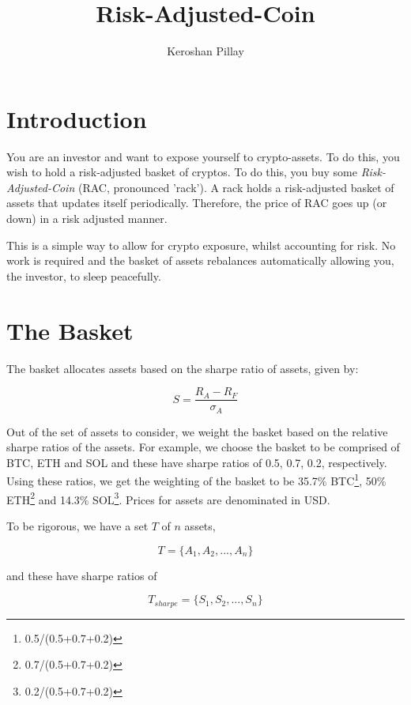 \documentclass[11pt]{article}
\title{Risk-Adjusted-Coin}
\author{Keroshan Pillay}
\begin{document}
\maketitle

\section{Introduction}

You are an investor and want to expose yourself to crypto-assets. To do this, you wish to hold a risk-adjusted basket of cryptos. To do this, you buy some \emph{Risk-Adjusted-Coin} (RAC, pronounced 'rack'). A rack holds a risk-adjusted basket of assets that updates itself periodically. Therefore, the price of RAC goes up (or down) in a risk adjusted manner. 

This is a simple way to allow for crypto exposure, whilst accounting for risk. No work is required and the basket of assets rebalances automatically allowing you, the investor, to sleep peacefully. 

\section{The Basket}


The basket allocates assets based on the sharpe ratio of assets, given by:

\begin{equation}
	S = \frac{R_A-R_F}{\sigma_A}
\end{equation}

Out of the set of assets to consider, we weight the basket based on the relative sharpe ratios of the assets. For example, we choose the basket to be comprised of BTC, ETH and SOL and these have sharpe ratios of 0.5, 0.7, 0.2, respectively. Using these ratios, we get the weighting of the basket to be 35.7\% BTC\footnote{0.5/(0.5+0.7+0.2)}, 50\% ETH\footnote{0.7/(0.5+0.7+0.2)} and 14.3\% SOL\footnote{0.2/(0.5+0.7+0.2)}. Prices for assets are denominated in USD.

\pagebreak

To be rigorous, we have a set $T$ of $n$ assets, 

\begin{equation}
	T=\{A_1,A_2,...,A_n\}
\end{equation}

and these have sharpe ratios of 

\begin{equation}
	T_{sharpe} = \{S_1,S_2,..., S_n\}
\end{equation}
\end{document}
